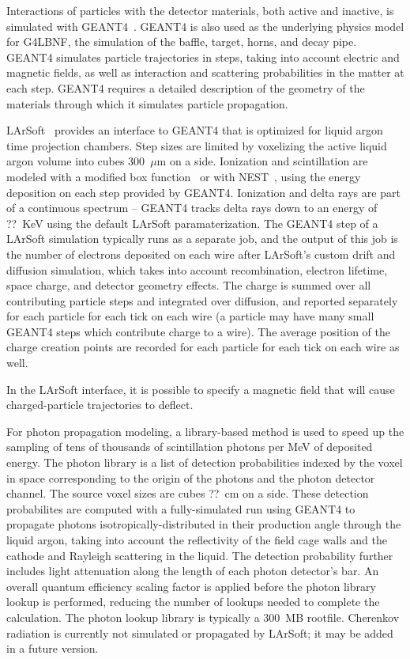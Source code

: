 Interactions of particles with the detector materials, both active and inactive, is simulated with 
GEANT4~\cite{geant4,Allison:2006ve}.  GEANT4 is also used as the underlying physics model for G4LBNF, the
simulation of the baffle, target, horns, and decay pipe.  GEANT4 simulates particle trajectories in steps,
taking into account electric and magnetic fields, as well as interaction and scattering probabilities in the
matter at each step.  GEANT4 requires a detailed description of the geometry of the materials through which
it simulates particle propagation.

LArSoft~\cite{larsoft.org} provides an interface to GEANT4 that is optimized for liquid argon time projection
chambers.  Step sizes are limited by voxelizing the active liquid argon volume into cubes 300~$\mu$m on a side.
Ionization and scintillation are modeled with a modified box function~\cite{Thomas:1987zz} or with 
NEST~\cite{Szydagis:2011tk,Szydagis:2013sih,Mock:2013ila,Lenardo:2014cva}, using
the energy deposition on each step provided by GEANT4.  Ionization and delta rays are part of a continuous
spectrum -- GEANT4 tracks delta rays down to an energy of ??~KeV using the default LArSoft paramaterization.
The GEANT4 step of a LArSoft simulation typically runs as a separate job, and the output of this job is the
number of electrons deposited on each wire after LArSoft's custom drift and diffusion simulation, which
takes into account recombination, electron lifetime, space charge, and detector geometry effects.  The charge
is summed over all contributing particle steps and integrated over diffusion, and reported separately for
each particle for each tick on each wire (a particle may have many small GEANT4 steps which contribute
charge to a wire).  The average position of the charge creation points are recorded for each particle for each
tick on each wire as well.  

In the LArSoft interface,  it is possible to specify a magnetic field that will cause charged-particle
trajectories to deflect.

For photon propagation modeling, a library-based method is used to speed up the sampling of tens of thousands of
scintillation photons per MeV of deposited energy.  The photon library is a list of detection probabilities
indexed by the voxel in space corresponding to the origin of the photons and the photon detector channel.
The source voxel sizes are cubes ??~cm on a side.  These detection probabilites are computed with a fully-simulated
run using GEANT4 to propagate photons isotropically-distributed in their production angle through the liquid argon,
taking into account the reflectivity of the field cage walls and the cathode and Rayleigh scattering in the liquid.
The detection probability further includes light attenuation along the length of each photon detector's bar.  An
overall quantum efficiency scaling factor is applied before the photon library lookup is performed, reducing the
number of lookups needed to complete the calculation.  The photon lookup library is typically a 300~MB rootfile.
Cherenkov radiation is currently not simulated or propagated by LArSoft; it may be added in a future version.

